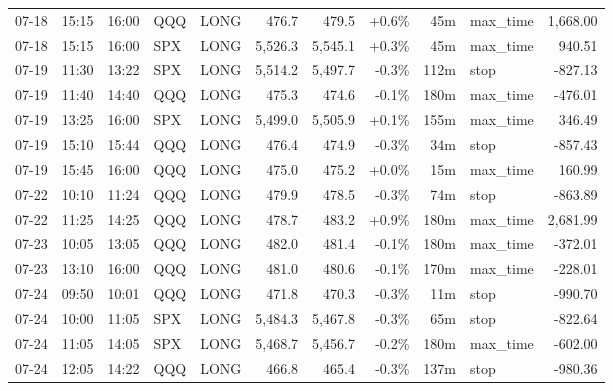 \documentclass[11pt,a4paper,twoside]{article}
\begin{document}
\begin{center}
\begin{longtable}{>{\color{txtmain}}l l l l l r r r r >{\color{txtmain}}l r}
07-18 & 15:15 & 16:00 & QQQ & LONG & 476.7 & 479.5 & \textcolor{wingreen}{+0.6\%} & 45m & max\_time & \textcolor{wingreen}{1,668.00} \\
07-18 & 15:15 & 16:00 & SPX & LONG & 5,526.3 & 5,545.1 & \textcolor{wingreen}{+0.3\%} & 45m & max\_time & \textcolor{wingreen}{940.51} \\
07-19 & 11:30 & 13:22 & SPX & LONG & 5,514.2 & 5,497.7 & \textcolor{lossred}{-0.3\%} & 112m & stop & \textcolor{lossred}{-827.13} \\
07-19 & 11:40 & 14:40 & QQQ & LONG & 475.3 & 474.6 & \textcolor{lossred}{-0.1\%} & 180m & max\_time & \textcolor{lossred}{-476.01} \\
07-19 & 13:25 & 16:00 & SPX & LONG & 5,499.0 & 5,505.9 & \textcolor{wingreen}{+0.1\%} & 155m & max\_time & \textcolor{wingreen}{346.49} \\
07-19 & 15:10 & 15:44 & QQQ & LONG & 476.4 & 474.9 & \textcolor{lossred}{-0.3\%} & 34m & stop & \textcolor{lossred}{-857.43} \\
07-19 & 15:45 & 16:00 & QQQ & LONG & 475.0 & 475.2 & \textcolor{wingreen}{+0.0\%} & 15m & max\_time & \textcolor{wingreen}{160.99} \\
07-22 & 10:10 & 11:24 & QQQ & LONG & 479.9 & 478.5 & \textcolor{lossred}{-0.3\%} & 74m & stop & \textcolor{lossred}{-863.89} \\
07-22 & 11:25 & 14:25 & QQQ & LONG & 478.7 & 483.2 & \textcolor{wingreen}{+0.9\%} & 180m & max\_time & \textcolor{wingreen}{2,681.99} \\
07-23 & 10:05 & 13:05 & QQQ & LONG & 482.0 & 481.4 & \textcolor{lossred}{-0.1\%} & 180m & max\_time & \textcolor{lossred}{-372.01} \\
07-23 & 13:10 & 16:00 & QQQ & LONG & 481.0 & 480.6 & \textcolor{lossred}{-0.1\%} & 170m & max\_time & \textcolor{lossred}{-228.01} \\
07-24 & 09:50 & 10:01 & QQQ & LONG & 471.8 & 470.3 & \textcolor{lossred}{-0.3\%} & 11m & stop & \textcolor{lossred}{-990.70} \\
07-24 & 10:00 & 11:05 & SPX & LONG & 5,484.3 & 5,467.8 & \textcolor{lossred}{-0.3\%} & 65m & stop & \textcolor{lossred}{-822.64} \\
07-24 & 11:05 & 14:05 & SPX & LONG & 5,468.7 & 5,456.7 & \textcolor{lossred}{-0.2\%} & 180m & max\_time & \textcolor{lossred}{-602.00} \\
07-24 & 12:05 & 14:22 & QQQ & LONG & 466.8 & 465.4 & \textcolor{lossred}{-0.3\%} & 137m & stop & \textcolor{lossred}{-980.36} \\

\end{longtable}
\end{center}
\end{document}
